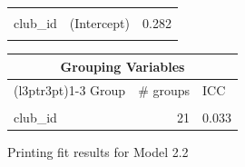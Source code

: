 \documentclass[
  12pt]{article}
\begin{document}
\begin{table}[!h]
\begin{tabular}{lll}
\midrule
\cellcolor{gray!10}{player\_id} & \cellcolor{gray!10}{(Intercept)} & \cellcolor{gray!10}{1.344}\\
club\_id & (Intercept) & 0.282\\
\cellcolor{gray!10}{Residual} & \cellcolor{gray!10}{} & \cellcolor{gray!10}{0.709}\\
\bottomrule
\end{tabular}
\end{table} \begin{table}[!h]
\centering
\begin{tabular}{lrl}
\toprule
\multicolumn{3}{c}{Grouping Variables} \\
\cmidrule(l{3pt}r{3pt}){1-3}
Group & \# groups & ICC\\
\midrule
\cellcolor{gray!10}{player\_id} & \cellcolor{gray!10}{2159} & \cellcolor{gray!10}{0.756}\\
club\_id & 21 & 0.033\\
\bottomrule
\end{tabular}
\end{table}

\newpage

Printing fit results for Model 2.2
\end{document}
